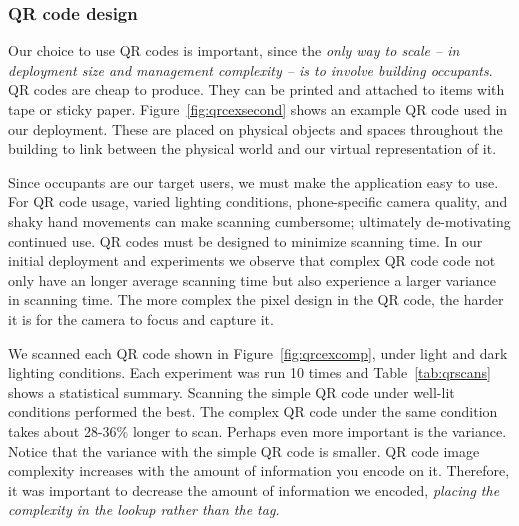 \subsubsection{QR code design}
\label{sec:qrc}
Our choice to use QR codes is important, since the \emph{only way to scale -- in deployment size and management complexity -- is to
involve building occupants}. QR codes are cheap to produce.  They can be printed and attached to items with tape or sticky paper.  
Figure~\ref{fig:qrcexsecond} shows an example QR code used in our deployment.  These are placed on physical
objects and spaces throughout the building to link between the physical world and our virtual representation of it.


Since occupants are our target users, we must make the application easy to use.  For QR code usage, varied lighting conditions, 
phone-specific camera quality, and shaky hand movements can make scanning cumbersome; ultimately de-motivating continued use.  
QR codes must be designed to minimize scanning time.  In our initial deployment and experiments we observe
that complex QR code code not only have an longer average scanning time but also experience a larger variance in scanning time.  
The more complex the pixel design in the QR code, the harder it is for the camera to focus and capture it. 


We scanned each QR code shown in Figure~\ref{fig:qrcexcomp}, under light and dark lighting conditions.  
Each experiment was run 10 times and Table~\ref{tab:qrscans} shows a statistical summary.  Scanning the simple QR code under well-lit 
conditions performed the best.  The complex QR code under  the same condition takes about 28-36\% longer to scan.
Perhaps even more important is the variance.  Notice that the variance with the simple QR code is smaller.
QR code image complexity increases with the amount of information you encode on it.  Therefore, it was important to decrease the
amount of information we encoded, \emph{placing the complexity in the lookup rather than the tag.}

